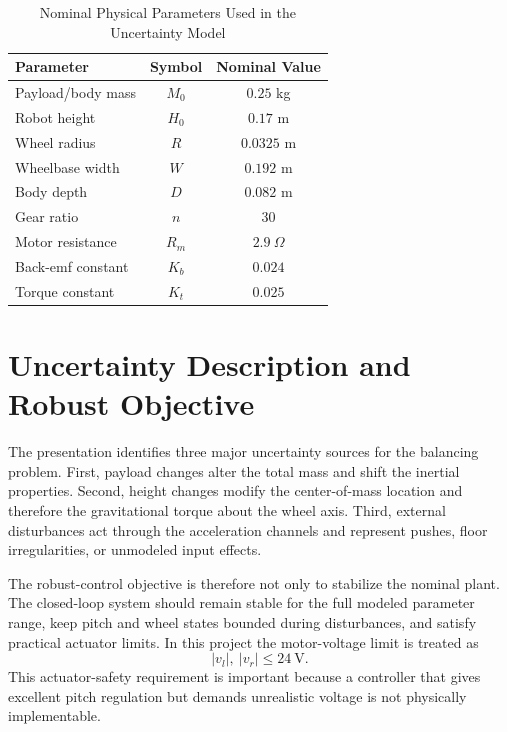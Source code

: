 \documentclass[conference]{IEEEtran}
\begin{document}
\begin{table}[!t]
\caption{Nominal Physical Parameters Used in the Uncertainty Model}
\label{tab:physical_params}
\centering
\begin{tabular}{lcc}
\toprule
Parameter & Symbol & Nominal Value\\
\midrule
Payload/body mass & $M_0$ & $0.25$ kg\\
Robot height & $H_0$ & $0.17$ m\\
Wheel radius & $R$ & $0.0325$ m\\
Wheelbase width & $W$ & $0.192$ m\\
Body depth & $D$ & $0.082$ m\\
Gear ratio & $n$ & $30$\\
Motor resistance & $R_m$ & $2.9~\Omega$\\
Back-emf constant & $K_b$ & $0.024$\\
Torque constant & $K_t$ & $0.025$\\
\bottomrule
\end{tabular}
\end{table}

\section{Uncertainty Description and Robust Objective}
The presentation identifies three major uncertainty sources for the balancing problem. First, payload changes alter the total mass and shift the inertial properties. Second, height changes modify the center-of-mass location and therefore the gravitational torque about the wheel axis. Third, external disturbances act through the acceleration channels and represent pushes, floor irregularities, or unmodeled input effects.

The robust-control objective is therefore not only to stabilize the nominal plant. The closed-loop system should remain stable for the full modeled parameter range, keep pitch and wheel states bounded during disturbances, and satisfy practical actuator limits. In this project the motor-voltage limit is treated as
\begin{equation}
|v_l|,\ |v_r| \leq 24~\mathrm{V}.
\end{equation}
This actuator-safety requirement is important because a controller that gives excellent pitch regulation but demands unrealistic voltage is not physically implementable.
\end{document}

